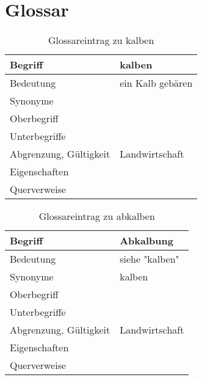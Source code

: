 \section{Glossar }

\begin{table}[h]
	\centering	
	
	\begin{tabular}{ p{4.5cm} p{10.5cm} } 
		\toprule[1pt]
		\rowcolor{maroon!30}
		
		\textbf{Begriff} &  \textbf{kalben} \\
		\midrule
		
		Bedeutung  & ein Kalb gebären \\
		Synonyme  &  \\
		Oberbegriff  &  \\
		Unterbegriffe   & \\
		Abgrenzung, Gültigkeit  & Landwirtschaft \\		
		Eigenschaften  & \\
		Querverweise  & \\
		
		\bottomrule
		
	\end{tabular}
	\label{tab: Glossareintrag zu kalben}
	\caption{Glossareintrag zu kalben}
\end{table}


\begin{table}[h]
	\centering	
	\begin{tabular}{ p{4.5cm} p{10.5cm} } 
		\toprule[1pt]
		\rowcolor{maroon!30}
		\textbf{Begriff} &  \textbf{Abkalbung}\\
		
		\midrule
		Bedeutung  & siehe "kalben" \\
		Synonyme  & kalben \\	
		Oberbegriff  &  \\
		Unterbegriffe   & \\
		Abgrenzung, Gültigkeit  & Landwirtschaft \\		
		Eigenschaften  & \\				
		Querverweise  & \\	
		\bottomrule				
		
	\end{tabular}
	\label{tab: Glossareintrag zu abkalben}
	\caption{Glossareintrag zu abkalben}
\end{table}


